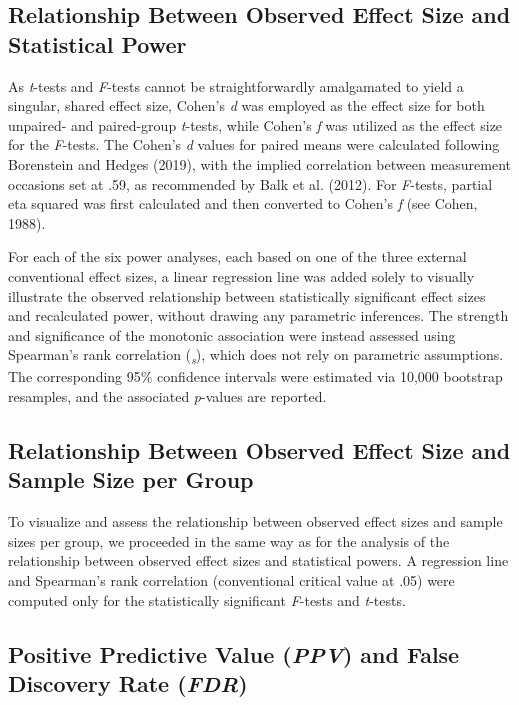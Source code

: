 \documentclass[authordate, meta, issue]{jote-new-article}
\begin{document}
	\subsection{Relationship Between Observed Effect Size and Statistical Power}



	As \emph{t}-tests and \emph{F}-tests cannot be straightforwardly amalgamated to yield a singular, shared effect size, Cohen's \emph{d} was employed as the effect size for both unpaired- and paired-group \emph{t}-tests, while Cohen's \emph{f} was utilized as the effect size for the \emph{F}-tests. The Cohen's \emph{d} values for paired means were calculated following Borenstein and Hedges (2019), with the implied correlation between measurement occasions set at .59, as recommended by Balk et al. (2012). For \emph{F}-tests, partial eta squared was first calculated and then converted to Cohen's \emph{f} (see Cohen, 1988).



	For each of the six power analyses, each based on one of the three external conventional effect sizes, a linear regression line was added solely to visually illustrate the observed relationship between statistically significant effect sizes and recalculated power, without drawing any parametric inferences. The strength and significance of the monotonic association were instead assessed using Spearman's rank correlation (\rho\textsubscript{\emph{s}}), which does not rely on parametric assumptions. The corresponding 95\% confidence intervals were estimated via 10,000 bootstrap resamples, and the associated \emph{p}-values are reported.



	\subsection{Relationship Between Observed Effect Size and Sample Size per Group}



	To visualize and assess the relationship between observed effect sizes and sample sizes per group, we proceeded in the same way as for the analysis of the relationship between observed effect sizes and statistical powers. A regression line and Spearman's rank correlation (conventional critical value at .05) were computed only for the statistically significant \emph{F}-tests and \emph{t}-tests.



	\subsection{Positive Predictive Value (\emph{PPV}) and False Discovery Rate (\emph{FDR})}
\end{document}
